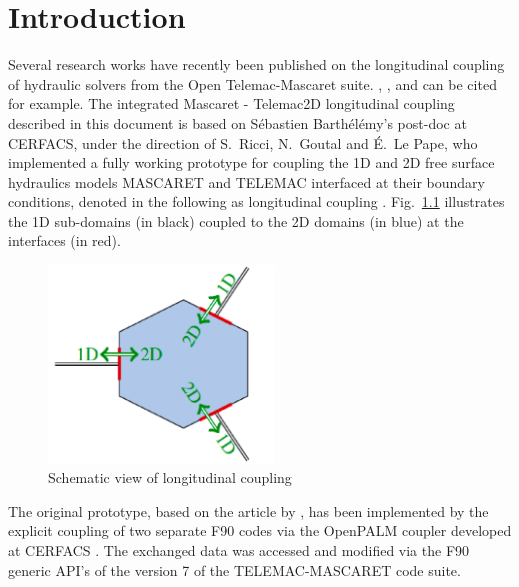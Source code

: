 \chapter{Introduction}
Several research works have recently been published on the
longitudinal coupling of hydraulic solvers from the Open
Telemac-Mascaret suite. \cite{Tayachi2013}, \cite{Tayachi2014}, and
\cite{PhDDaou} can be cited for example.
The integrated Mascaret - Telemac2D longitudinal coupling described in
this document is based on S\'ebastien Barth\'el\'emy's post-doc at
CERFACS, under the
direction of S.~Ricci, N.~Goutal and \'E.~Le Pape, who implemented a
fully working prototype for coupling the 1D and 2D free surface
hydraulics models MASCARET and TELEMAC interfaced at their boundary
conditions, denoted in the following as longitudinal coupling
\cite{Barthelemy2018, BarthelemyPhD,
  Ricci2018EoCoE}. Fig.~\ref{fig:Schema_1D-2D_interface} illustrates
the 1D sub-domains (in black) coupled to the 2D domains (in blue) at
the interfaces (in red).
\begin{figure}[htbp]
    \centering
        \centering \includegraphics[width=6cm]{graphics/Schema_1D-2D_interface.png}
    \caption{Schematic view of longitudinal coupling}\label{fig:Schema_1D-2D_interface}
\end{figure}

The original prototype, based on the article by \cite{Malleron2011},
has been implemented by the explicit coupling
of two separate F90 codes via the OpenPALM coupler developed at
CERFACS \cite{piacentini2011palm}. The exchanged data was accessed and
modified via the F90
generic API's of the version 7 of the TELEMAC-MASCARET code suite.

